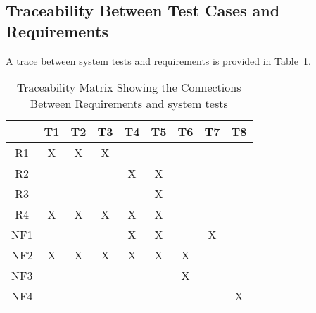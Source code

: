 \documentclass[12pt, titlepage]{article}
\begin{document}
\subsection{Traceability Between Test Cases and Requirements}
A trace between system tests and requirements is provided in 
\hyperref[tab:reqtrace]{Table~\ref*{tab:reqtrace}}.

\begin{table}[h!]
\centering
\begin{tabular}{|c|c|c|c|c|c|c|c|c|}
\hline
	& T1 & T2 & T3 & T4 & T5 & T6 & T7 &T8  \\
\hline
R1  & X&X & X& & & & &  \\ \hline
R2  & & & &X & X& & &   \\ \hline
R3  & & & & & X& & &   \\ \hline
R4  &X & X& X& X&X & & &  \\ \hline
NF1 & & & &X & X& & X&   \\ \hline
NF2   & X& X& X&X & X& X& &  \\ \hline
NF3   & & & & & & X& &  \\ \hline
NF4   & & & & & & & &X  \\ \hline
\hline
\end{tabular}
\caption{Traceability Matrix Showing the Connections Between Requirements and system tests}
\label{tab:reqtrace}
\end{table}
\end{document}
